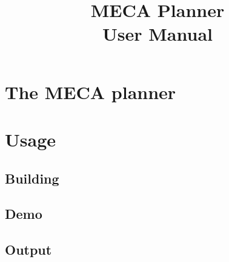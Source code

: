\documentclass{article}
\title{MECA Planner  \\
\large User Manual
}
\begin{document}
\maketitle

\tableofcontents


\section{The MECA planner}

\section{Usage}
\subsection{Building}
\subsection{Demo}
\subsection{Output}
\end{document}
